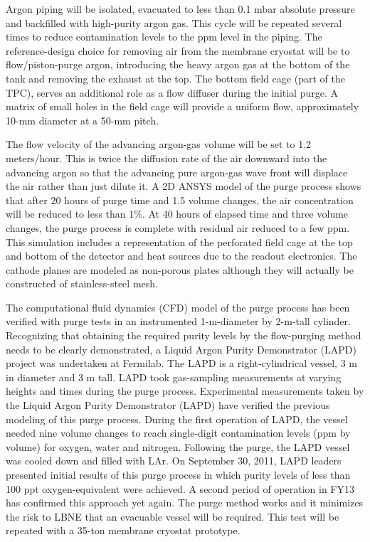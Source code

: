 Argon piping will be isolated, evacuated to less than 0.1 mbar absolute pressure and backfilled
with high-purity argon gas. This cycle will be repeated several times to reduce contamination
levels to the ppm level in the piping. The reference-design choice for removing air from the
membrane cryostat will be to flow/piston-purge argon, introducing the heavy argon gas at the
bottom of the tank and removing the exhaust at the top. The bottom field cage (part of the
TPC), serves an additional role as a flow diffuser during the initial
purge. A matrix of small holes in the field cage will provide a uniform flow, approximately
10-mm diameter at a 50-mm pitch. 

The flow velocity of the advancing argon-gas volume will be set to 1.2 meters/hour. This is twice the diffusion rate of the air downward into the advancing argon so that the advancing pure argon-gas wave front will displace the air rather than just dilute it. A
2D ANSYS model of the purge process shows that after 20 hours of purge time and 1.5 volume changes, the air concentration will be reduced to less than 1\%. At 40 hours of elapsed time and three volume
changes, the purge process is complete with residual air reduced to a few ppm. This
simulation includes a representation of the perforated field cage at the top and bottom of the
detector and heat sources due to the readout electronics. The cathode
planes are modeled as non-porous plates although they will actually be constructed of stainless-steel
mesh.

The computational fluid dynamics (CFD) model of the purge process has been verified with
purge tests in an instrumented 1-m-diameter by 2-m-tall cylinder. Recognizing that obtaining
the required purity levels by the flow-purging method needs to be clearly demonstrated, a
Liquid Argon Purity Demonstrator (LAPD) project was undertaken
at Fermilab. The LAPD is a right-cylindrical vessel, 3 m in diameter and 3 m tall. LAPD took gas-sampling measurements
at varying heights and times during the purge process. Experimental measurements taken by
the Liquid Argon Purity Demonstrator (LAPD) have verified the previous modeling of this
purge process. During the first operation of LAPD, the vessel
needed nine volume changes to reach single-digit contamination levels
(ppm by volume) for oxygen, water and nitrogen. Following
the purge, the LAPD vessel was cooled down and filled with LAr.
On September 30, 2011, LAPD leaders presented initial results of this purge process in which
purity levels of less than 100 ppt oxygen-equivalent were achieved.
A second period of operation in FY13 has confirmed this approach yet again. The
purge method works and it minimizes the risk to LBNE that an evacuable vessel will be
required. This test will be repeated with a 35-ton membrane cryostat
prototype.

